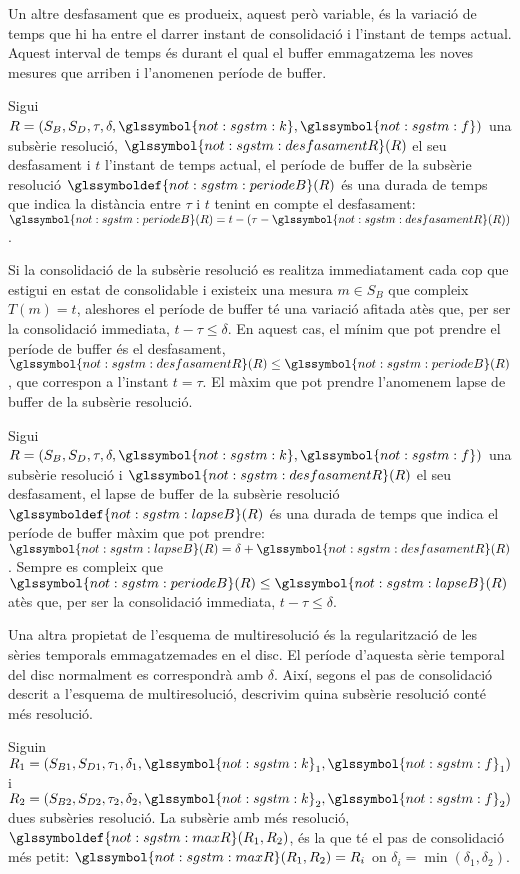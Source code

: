 Un altre desfasament que es produeix, aquest però variable, és la
variació de temps que hi ha entre el darrer instant de consolidació i
l'instant de temps actual. Aquest interval de temps és durant el qual
el buffer emmagatzema les noves mesures que arriben i l'anomenen
període de buffer.
\begin{definition}
  Sigui
  $R=(S_B,S_D,\tau,\delta,\glssymbol{not:sgstm:k},\glssymbol{not:sgstm:f})$
  una subsèrie resolució, $\glssymbol{not:sgstm:desfasamentR}(R)$ el
  seu desfasament i $t$ l'instant de temps actual, el període de
  buffer de la subsèrie resolució
  $\glssymboldef{not:sgstm:periodeB}(R)$ és una durada de temps que
  indica la distància entre $\tau$ i $t$ tenint en compte el
  desfasament: $\glssymbol{not:sgstm:periodeB}(R) = t - (\tau -
  \glssymbol{not:sgstm:desfasamentR}(R))$.
\end{definition}

Si la consolidació de la subsèrie resolució es realitza immediatament
cada cop que estigui en estat de consolidable i existeix una mesura
$m\in S_B$ que compleix $T(m)=t$, aleshores el període de buffer té
una variació afitada atès que, per ser la consolidació immediata, $t
- \tau \leq \delta$. En aquest cas, el mínim que pot prendre el
període de buffer és el desfasament,
$\glssymbol{not:sgstm:desfasamentR}(R)\leq
\glssymbol{not:sgstm:periodeB}(R)$, que correspon a l'instant
$t=\tau$. El màxim que pot prendre l'anomenem lapse de buffer de la
subsèrie resolució.
\begin{definition}
  Sigui
  $R=(S_B,S_D,\tau,\delta,\glssymbol{not:sgstm:k},\glssymbol{not:sgstm:f})$
  una subsèrie resolució i $\glssymbol{not:sgstm:desfasamentR}(R)$ el
  seu desfasament, el lapse de buffer de la subsèrie resolució
  $\glssymboldef{not:sgstm:lapseB}(R)$ és una durada de temps que
  indica el període de buffer màxim que pot prendre:
  $\glssymbol{not:sgstm:lapseB}(R) = \delta +
  \glssymbol{not:sgstm:desfasamentR}(R)$.  Sempre es compleix que
  $\glssymbol{not:sgstm:periodeB}(R) \leq
  \glssymbol{not:sgstm:lapseB}(R)$ atès que, per ser la consolidació
  immediata, $t - \tau \leq \delta$.
\end{definition}


Una altra propietat de l'esquema de multiresolució és la
regularització de les sèries temporals emmagatzemades en el disc. El
període d'aquesta sèrie temporal del disc normalment es correspondrà
amb $\delta$.  Així, segons el pas de consolidació descrit a
l'esquema de multiresolució, descrivim quina subsèrie resolució conté
més resolució.
\begin{definition}
  Siguin
  $R_1=(S_{B1},S_{D1},\tau_1,\delta_1,\glssymbol{not:sgstm:k}_1,\glssymbol{not:sgstm:f}_1)$
  i
  $R_2=(S_{B2},S_{D2},\tau_2,\delta_2,\glssymbol{not:sgstm:k}_2,\glssymbol{not:sgstm:f}_2)$
  dues subsèries resolució. La subsèrie amb més resolució,
  $\glssymboldef{not:sgstm:maxR}(R_1,R_2)$, és la que té el pas de
  consolidació més petit: $\glssymbol{not:sgstm:maxR}(R_1,R_2) = R_i$
  on $\delta_i = \min(\delta_1,\delta_2)$.
\end{definition}

